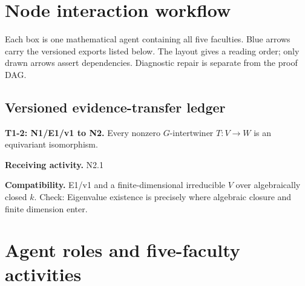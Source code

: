 \documentclass[preprint,12pt,aps,pra,showkeys,amsmath,amssymb,superscriptaddress,floatfix]{revtex4-2}
\theoremstyle{definition}
\theoremstyle{remark}
\newcommand{\field}[2]{\par\smallskip\noindent\textbf{#1.} #2\par}
\begin{document}
\clearpage\section{Node interaction workflow}

\begin{center}\end{center}

Each box is one mathematical agent containing all five faculties. Blue
arrows carry the versioned exports listed below. The layout gives a
reading order; only drawn arrows assert dependencies. Diagnostic repair
is separate from the proof DAG.

\subsection{Versioned evidence-transfer ledger}

\begingroup\small\linespread{1.05}\selectfont

\field{T1-2: N1/E1/v1 to N2}{Every nonzero \(G\)-intertwiner \(T:V\to W\) is an equivariant
isomorphism.}

\field{Receiving activity}{N2.1}

\field{Compatibility}{E1/v1 and a finite-dimensional irreducible \(V\) over algebraically
closed \(k\). Check: Eigenvalue existence is precisely where algebraic
closure and finite dimension enter.}

\endgroup

\clearpage\section{Agent roles and five-faculty activities}\begingroup\small\linespread{1.05}\selectfont{}
\end{document}
